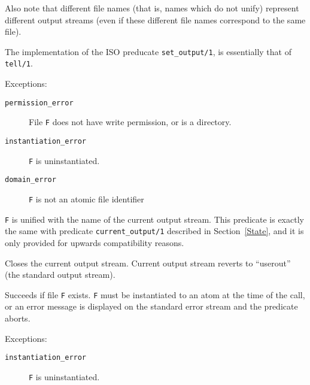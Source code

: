 \begin{description}
    Also note that different file names (that is, names which do not unify) 
    represent different output streams (even if these different file names 
    correspond to the same file).

    The implementation of the ISO preducate {\tt set\_output/1}, is
    essentially that of {\tt tell/1}.

    Exceptions:
    \begin {description}
    \item[{\tt permission\_error}]
	File {\tt F} does not have write permission, or is a directory.
    \item[{\tt instantiation\_error}]
	{\tt F} is uninstantiated.
    \item[{\tt domain\_error}]
    	{\tt F} is not an atomic file identifier
    \end{description}

    {\tt F} is unified with the name of the current output stream.
    This predicate is exactly the same with predicate {\tt current\_output/1}
    described in Section~\ref{State}, and it is only provided for
    upwards compatibility reasons.

    Closes the current output stream. 
    Current output stream reverts to ``userout'' (the standard output stream).

    Succeeds if file {\tt F} exists. {\tt F} must be instantiated to
    an atom at the time of the call, or an error message is displayed on
    the standard error stream and the predicate aborts.

    Exceptions:
    \begin {description}
    \item[{\tt instantiation\_error}]
	{\tt F} is uninstantiated.
    \end{description}

\end{description}


